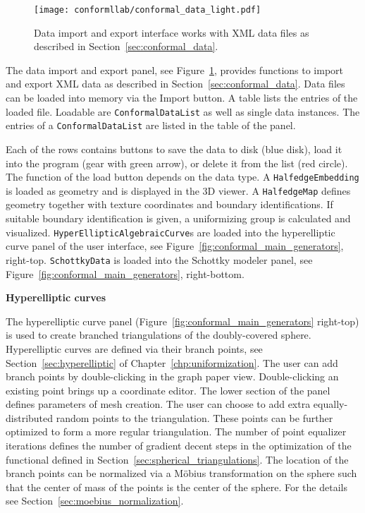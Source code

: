 \documentclass[Thesis.tex]{subfiles}
\begin{document}
\begin{figure}
\centering
\texttt{[image: conformllab/conformal\_data\_light.pdf]}
\caption{Data import and export interface works with XML data files as described in 
Section~\ref{sec:conformal_data}.}
\label{fig:data_interface}
\end{figure}

The data import and export panel, see Figure~\ref{fig:data_interface}, provides functions to import and export XML data as described in Section~\ref{sec:conformal_data}.  
Data files can be loaded into memory via the Import button. A table lists the entries of the loaded file.  
Loadable are {\tt ConformalDataList} as well as single data instances. 
The entries of a {\tt ConformalDataList} are listed in the table of the panel. 

Each of the rows contains buttons to save the data to disk (blue disk), load it into the program (gear with green arrow), or delete it from the list (red circle).  
The function of the load button depends on the data type. 
A {\tt HalfedgeEmbedding} is loaded as geometry and is displayed in the 3D viewer. 
A {\tt HalfedgeMap} defines geometry together with texture coordinates and boundary identifications. 
If suitable boundary identification is given, a uniformizing group is calculated and visualized. 
{\tt HyperEllipticAlgebraicCurve}s are loaded into the hyperelliptic curve panel of the user interface, see Figure~\ref{fig:conformal_main_generators}, right-top.  
{\tt SchottkyData} is loaded into the Schottky modeler panel, see Figure~\ref{fig:conformal_main_generators}, right-bottom.


{\bf Hyperelliptic curves}
\nopagebreak

The hyperelliptic curve panel (Figure~\ref{fig:conformal_main_generators} right-top) is used to create branched triangulations of the doubly-covered sphere.
Hyperelliptic curves are defined via their branch points, see Section~\ref{sec:hyperelliptic} of Chapter~\ref{chp:uniformization}.
The user can add branch points by double-clicking in the graph paper view.
Double-clicking an existing point brings up a coordinate editor. 
The lower section of the panel defines parameters of mesh creation. 
The user can choose to add extra equally-distributed random points to the triangulation.
These points can be further optimized to form a more regular triangulation.
The number of point equalizer iterations defines the number of gradient decent steps in the optimization of the functional defined in Section~\ref{sec:spherical_triangulations}.
The location of the branch points can be normalized via a M{\"o}bius transformation on the sphere such that the center of mass of the points is the center of the sphere. For the details see Section~\ref{sec:moebius_normalization}.
\end{document}
